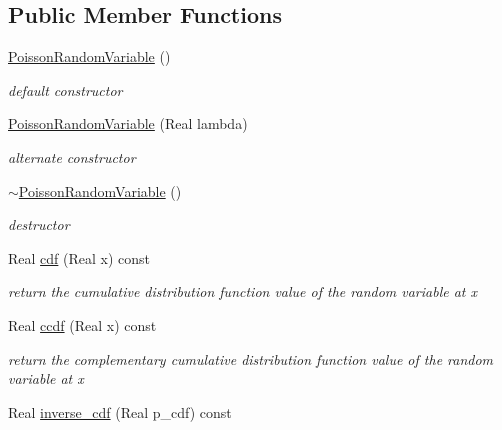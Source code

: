 \subsection*{Public Member Functions}
\begin{DoxyCompactItemize}
\item 
\hyperlink{classPecos_1_1PoissonRandomVariable_a60dad25107dcedf527b70a0657daf2e3}{Poisson\+Random\+Variable} ()\label{classPecos_1_1PoissonRandomVariable_a60dad25107dcedf527b70a0657daf2e3}

\begin{DoxyCompactList}\small\item\em default constructor \end{DoxyCompactList}\item 
\hyperlink{classPecos_1_1PoissonRandomVariable_a6f2db368d16c9a8110212efa60d5e708}{Poisson\+Random\+Variable} (Real lambda)\label{classPecos_1_1PoissonRandomVariable_a6f2db368d16c9a8110212efa60d5e708}

\begin{DoxyCompactList}\small\item\em alternate constructor \end{DoxyCompactList}\item 
\hyperlink{classPecos_1_1PoissonRandomVariable_a24cb85aae353f1da7ad1f44c1cf9ae4c}{$\sim$\+Poisson\+Random\+Variable} ()\label{classPecos_1_1PoissonRandomVariable_a24cb85aae353f1da7ad1f44c1cf9ae4c}

\begin{DoxyCompactList}\small\item\em destructor \end{DoxyCompactList}\item 
Real \hyperlink{classPecos_1_1PoissonRandomVariable_addd564e7f4f314e12d38df74d845f0d8}{cdf} (Real x) const \label{classPecos_1_1PoissonRandomVariable_addd564e7f4f314e12d38df74d845f0d8}

\begin{DoxyCompactList}\small\item\em return the cumulative distribution function value of the random variable at x \end{DoxyCompactList}\item 
Real \hyperlink{classPecos_1_1PoissonRandomVariable_a23c3b599e7e4788a9a5e9e93c3dbaf4d}{ccdf} (Real x) const \label{classPecos_1_1PoissonRandomVariable_a23c3b599e7e4788a9a5e9e93c3dbaf4d}

\begin{DoxyCompactList}\small\item\em return the complementary cumulative distribution function value of the random variable at x \end{DoxyCompactList}\item 
Real \hyperlink{classPecos_1_1PoissonRandomVariable_a918a1aac05ca349ea5313eebcba46c3e}{inverse\+\_\+cdf} (Real p\+\_\+cdf) const \label{classPecos_1_1PoissonRandomVariable_a918a1aac05ca349ea5313eebcba46c3e}


\end{DoxyCompactItemize}
